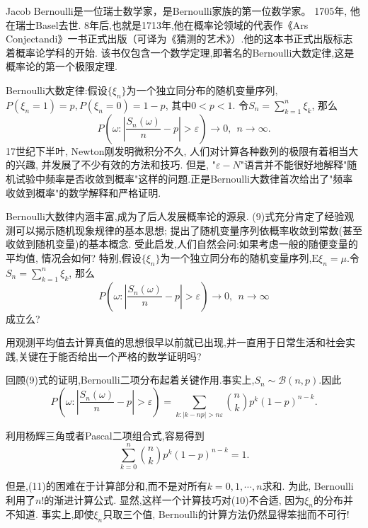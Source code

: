 \documentclass[a4paper,AutoFakeBold,oneside,12pt]{article}
\begin{document}
Jacob Bernoulli是一位瑞士数学家，是Bernoulli家族的第一位数学家。 1705年, 他在瑞士Basel去世. 8年后,也就是1713年,他在概率论领域的代表作《Ars Conjectandi》一书正式出版（可译为《猜测的艺术》）.他的这本书正式出版标志着概率论学科的开始. 该书仅包含一个数学定理,即著名的Bernoulli大数定律,这是概率论的第一个极限定理.

Bernoulli大数定律:假设$\{\xi_n\}$为一个独立同分布的随机变量序列,$P(\xi_n = 1) = p, P(\xi_n = 0) = 1-p$, 其中$0<p<1$. 令$S_n = \sum_{k=1}^{n}\xi_k$, 那么
\begin{equation}
	P\left(\omega:\left|\frac{S_n(\omega)}{n}-p\right|>\varepsilon \right)\to 0,~~n\to\infty.
\end{equation}
17世纪下半叶, Newton刚发明微积分不久, 人们对计算各种数列的极限有着相当大的兴趣, 并发展了不少有效的方法和技巧. 但是, "$\varepsilon-N$"语言并不能很好地解释"随机试验中频率是否收敛到概率"这样的问题.正是Bernoulli大数律首次给出了"频率收敛到概率"的数学解释和严格证明.

Bernoulli大数律内涵丰富,成为了后人发展概率论的源泉. (9)式充分肯定了经验观测可以揭示随机现象规律的基本思想; 提出了随机变量序列依概率收敛到常数(甚至收敛到随机变量)的基本概念. 受此启发,人们自然会问:如果考虑一般的随便变量的平均值, 情况会如何? 特别,假设$\{\xi_n\}$为一个独立同分布的随机变量序列,$\mathrm{E}\xi_n = \mu$.令$S_n = \sum_{k=1}^{n}\xi_k$, 那么\begin{equation}
P\left(\omega:\left|\frac{S_n(\omega)}{n}-p\right|>\varepsilon \right)\to 0,~~n\to\infty
\end{equation}成立么?

用观测平均值去计算真值的思想很早以前就已出现,并一直用于日常生活和社会实践,关键在于能否给出一个严格的数学证明吗?

回顾(9)式的证明,Bernoulli二项分布起着关键作用.事实上,$S_n\sim \mathcal{B}(n,p)$.因此
\begin{equation}
	P\left(\omega:\left|\frac{S_n(\omega)}{n}-p\right|>\varepsilon \right)	= \sum_{k:|k-np|>n\varepsilon}\binom{n}{k}p^k(1-p)^{n-k}.	
\end{equation}

利用杨辉三角或者Pascal二项组合式,容易得到\begin{equation}
	\sum_{k=0}^n\binom{n}{k}p^k(1-p)^{n-k} = 1.	
\end{equation}

但是,(11)的困难在于计算部分和,而不是对所有$k=0,1,\cdots,n$求和. 为此, Bernoulli利用了$n!$的渐进计算公式. 显然,这样一个计算技巧对(10)不合适, 因为$\xi_n$的分布并不知道. 事实上,即使$\xi_n$只取三个值, Bernoulli的计算方法仍然显得笨拙而不可行!
\end{document}
